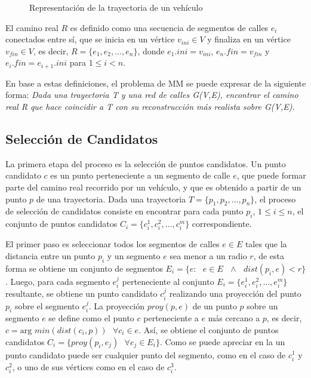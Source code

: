 \begin{figure}[h*]
	\centering
	
	\caption{\label{fig:trayectoria} Representación de la trayectoria de un vehículo}	
\end{figure}

El camino real $R$ es definido como una secuencia de segmentos de calles $e_i$ conectados entre sí, que se inicia en un vértice $v_{ini} \in V$ y finaliza en un vértice $v_{fin} \in V$, es decir, $R = \{ e_1, e_2, \dots, e_n \}$, donde $e_1.ini = v_{ini}$, $e_n.fin = v_{fin}$ y $e_i.fin = e_{i + 1}.ini$ para $1 \le i < n$.

En base a estas definiciones, el problema de MM se puede expresar de la siguiente forma: \emph{Dada una trayectoria T y una red de calles G(V,E), encontrar el camino real R que hace coincidir a T con su reconstrucción más realista sobre G(V,E).}

\subsection{Selección de Candidatos}
\label{seleccion_de_candidatos}

La primera etapa del proceso es la selección de puntos candidatos. Un punto candidato $c$ es un punto perteneciente a un segmento de calle $e$, que puede formar parte del camino real recorrido por un vehículo, y que es obtenido a partir de un punto $p$ de una trayectoria. Dada una trayectoria $T = \{p_1, p_2, \dots, p_n\}$, el proceso de selección de candidatos consiste en encontrar para cada punto $p_i$, $1\le i\le n$, el conjunto de puntos candidatos $C_i = \{c_{i}^{1}, c_{i}^{2}, \dots, c_{i}^{m}\}$ correspondiente.

El primer paso es seleccionar todos los segmentos de calles $e \in E$ tales que la distancia entre un punto $p_i$ y un segmento $e$ sea menor a un radio $r$, de esta forma se obtiene un conjunto de segmentos $E_i = \{ e : \text{ } e \in E \text{ } \wedge \text{ } dist(p_i, e) < r \}$. Luego, para cada segmento $e_{i}^{j}$ perteneciente al conjunto $E_i = \{e_{i}^{1}, e_{i}^{2}, \dots, e_{i}^{m}\}$ resultante, se obtiene un punto candidato $c_{i}^{j}$ realizando una proyección del punto $p_i$ sobre el segmento $e_{i}^{j}$. La proyección $proy(p, e)$ de un punto $p$ sobre un segmento $e$ se define como el punto $c$ perteneciente a $e$ más cercano a $p$, es decir, $c = \text{arg } min(dist(c_i, p)) \text{ } \forall c_i \in e$. Así, se obtiene el conjunto de puntos candidatos $C_i = \{ proy(p_i, e_j) \text{ } \forall e_j \in E_i \}$. Como se puede apreciar en la  un punto candidato puede ser cualquier punto del segmento, como en el caso de $c_{i}^{1}$ y $c_{i}^{2}$, o uno de sus vértices como en el caso de $c_{i}^{3}$.

